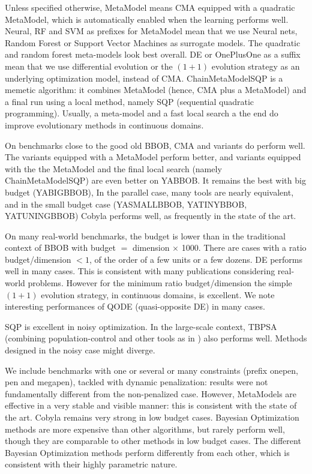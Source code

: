 Unless specified otherwise, MetaModel means CMA equipped with a quadratic MetaModel, which is automatically enabled when the learning performs well.
Neural, RF and SVM as prefixes for MetaModel mean that we use Neural nets, Random Forest or Support Vector Machines as
surrogate models. The quadratic and random forest meta-models look best overall. DE or OnePlusOne as a suffix mean that
we use differential evolution or the $(1+1)$ evolution strategy as an underlying optimization model, instead of CMA.
ChainMetaModelSQP is a memetic algorithm: it combines MetaModel (hence, CMA plus a MetaModel) and a final run using a local method, namely SQP (sequential quadratic programming).
Usually, a meta-model and a fast local search a the end do improve evolutionary methods in continuous domains. 

On benchmarks close to the good old BBOB, CMA and variants do perform well. The variants equipped with a MetaModel perform better, and
variants equipped with the the MetaModel and the final local search (namely ChainMetaModelSQP) are even better on YABBOB. It
remains the best with big budget (YABIGBBOB), In the parallel case, many tools are nearly equivalent, and in the small
budget case (YASMALLBBOB, YATINYBBOB, YATUNINGBBOB) Cobyla performs well, as frequently in the state of the art.%

On many real-world benchmarks, the budget is lower than in the traditional context of BBOB with budget $=$ dimension $\times$ 1000. There
are cases with a ratio budget/dimension $<1$, of the order of a few units or a few dozens. DE performs well in many
cases. This is consistent with many publications considering real-world problems. %
However for the minimum ratio budget/dimension the simple $(1+1)$ evolution strategy, in continuous domains, is
excellent.
We note interesting performances of QODE (quasi-opposite DE) in many cases.

SQP is excellent in noisy optimization. In the large-scale context, TBPSA (combining population-control\cite{mlis} and other tools as in \cite{vasilfoga}) also performs well.
Methods designed in the noisy case might diverge.

We include benchmarks with one or several or many constraints (prefix onepen, pen and megapen), tackled with dynamic
penalization: results were not fundamentally different from the non-penalized case. However, MetaModels are effective in
a very stable and visible manner: this is consistent with the state of the art.%
Cobyla remains very strong in low budget cases. Bayesian Optimization methods are more expensive than other algorithms,
but rarely perform well, though they are comparable to other methods in low budget cases. The different Bayesian
Optimization methods perform differently from each other, which is consistent with their highly parametric nature.

